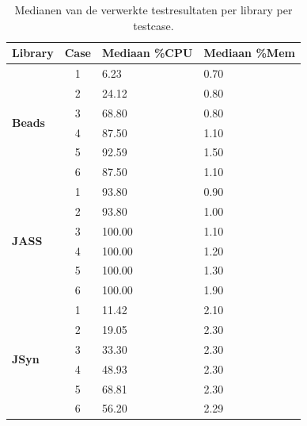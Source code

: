 \begin{table}[]
\centering
\begin{tabular}{l|c|l|l}
\textbf{Library} & \textbf{Case} & \textbf{Mediaan \%CPU} & \textbf{Mediaan \%Mem} \\ \hline
\multirow{6}{*}{\textbf{Beads}} & 1             & 6.23      & 0.70     \\
                           & 2             & 24.12      & 0.80    \\
                          & 3             & 68.80      & 0.80         \\
                          & 4             & 87.50     & 1.10           \\
                          & 5             & 92.59    & 1.50                  \\
                          & 6             & 87.50    & 1.10       \\ \hline
\multirow{6}{*}{\textbf{JASS}}                      & 1             & 93.80     & 0.90          \\
                                                    & 2             & 93.80   & 1.00                    \\
                                                    & 3             & 100.00        & 1.10    \\
                                                    & 4             & 100.00     & 1.20         \\
                                                    & 5             & 100.00                  & 1.30           \\
                                                    & 6             & 100.00      & 1.90           \\ \hline
\multirow{6}{*}{\textbf{JSyn}}                      & 1             & 11.42    & 2.10           \\
                                                    & 2             & 19.05   & 2.30   \\
                                                    & 3             & 33.30     & 2.30         \\
                                                    & 4             & 48.93    & 2.30          \\
                                                    & 5             & 68.81    & 2.30         \\
                                                    & 6             & 56.20    & 2.29       \\ \hline
\end{tabular}
\caption{Medianen van de verwerkte testresultaten per library per testcase.}
\label{medians}
\end{table}

